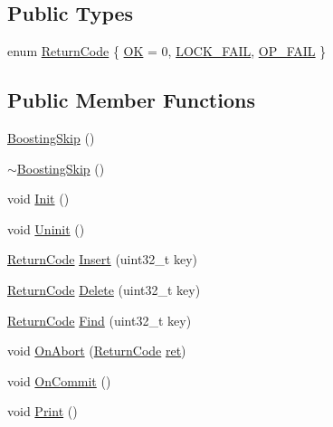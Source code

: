 \subsection*{Public Types}
\begin{DoxyCompactItemize}
\item 
enum \hyperlink{classBoostingSkip_a85dbc5bd5f06d670bc16da63477b789e}{Return\-Code} \{ \hyperlink{classBoostingSkip_a85dbc5bd5f06d670bc16da63477b789eab72a501a61cbc451f76dd0136ae857d4}{O\-K} = 0, 
\hyperlink{classBoostingSkip_a85dbc5bd5f06d670bc16da63477b789eab075c498ecbcc1a87bd709e75402395f}{L\-O\-C\-K\-\_\-\-F\-A\-I\-L}, 
\hyperlink{classBoostingSkip_a85dbc5bd5f06d670bc16da63477b789ea2f7890f6a7a9c87e2edca71371c230b4}{O\-P\-\_\-\-F\-A\-I\-L}
 \}
\end{DoxyCompactItemize}
\subsection*{Public Member Functions}
\begin{DoxyCompactItemize}
\item 
\hyperlink{classBoostingSkip_a72c8865501cc633f3a3476379246f4e1}{Boosting\-Skip} ()
\item 
\hyperlink{classBoostingSkip_a91f70e1d59757dc0159146a342bf945d}{$\sim$\-Boosting\-Skip} ()
\item 
void \hyperlink{classBoostingSkip_a10ef6f93a2e0d7c84d8fc59fc767efb1}{Init} ()
\item 
void \hyperlink{classBoostingSkip_a1b3599db6fc691173c18efcf5dde67b3}{Uninit} ()
\item 
\hyperlink{classBoostingSkip_a85dbc5bd5f06d670bc16da63477b789e}{Return\-Code} \hyperlink{classBoostingSkip_ae0ddab9bd1e3d1972fc8bcaa74a9ed81}{Insert} (uint32\-\_\-t key)
\item 
\hyperlink{classBoostingSkip_a85dbc5bd5f06d670bc16da63477b789e}{Return\-Code} \hyperlink{classBoostingSkip_ab1f1f0ba800de912c42ec328767c4685}{Delete} (uint32\-\_\-t key)
\item 
\hyperlink{classBoostingSkip_a85dbc5bd5f06d670bc16da63477b789e}{Return\-Code} \hyperlink{classBoostingSkip_a8a58f9a9cba8a359cbbba216342ce0bd}{Find} (uint32\-\_\-t key)
\item 
void \hyperlink{classBoostingSkip_ac9bf8693a172f366ae733c5a78804071}{On\-Abort} (\hyperlink{classBoostingSkip_a85dbc5bd5f06d670bc16da63477b789e}{Return\-Code} \hyperlink{stmskip_8cc_a339672ff94e6199019102f50d317c3d7}{ret})
\item 
void \hyperlink{classBoostingSkip_a11e9245271ac6c84d37854be867e8f6b}{On\-Commit} ()
\item 
void \hyperlink{classBoostingSkip_a22e900668d5482f1b2631339893e8976}{Print} ()
\end{DoxyCompactItemize}
